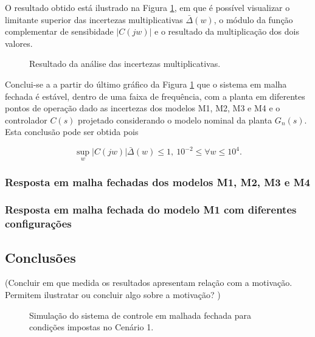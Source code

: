 O resultado obtido está ilustrado na Figura
\ref{fig:desafio-2:resultado-questao-3-4}, em que é possível visualizar o
limitante superior das incertezas multiplicativas $\bar{\Delta}(w)$, o módulo da
função complementar de sensibidade $|\textit{C}(jw)|$ e o resultado da
multiplicação dos dois valores.

\begin{figure}[!ht]
    \caption{Resultado da análise das incertezas multiplicativas.}
    \vspace{-10pt}
    \hspace{-30pt}
    \label{fig:desafio-2:resultado-questao-3-4}
    \begin{minipage}{\linewidth}
        
    \end{minipage}
\end{figure}

Conclui-se a a partir do último gráfico da Figura
\ref{fig:desafio-2:resultado-questao-3-4} que o sistema em malha fechada é
estável, dentro de uma faixa de frequência, com a planta em diferentes pontos de
operação dado as incertezas dos modelos M1, M2, M3 e M4 e o controlador $C(s)$
projetado considerando o modelo nominal da planta $G_{n}(s)$. Esta conclusão
pode ser obtida pois

\begin{equation}
    \label{eq:desafio-2:principio-do-modelo-interno}
    \sup_{w}|\textit{C}(jw)|\bar{\Delta}(w) \le 1, \ 10^{-2} \leq \forall w \leq {10^{4}}.
\end{equation}

\subsubsection{Resposta em malha fechadas dos modelos M1, M2, M3 e M4}
\subsubsection{Resposta em malha fechada do modelo M1 com diferentes configurações}

\subsection{Conclusões}
(Concluir em que medida os resultados apresentam relação com a motivação.
Permitem ilustratar ou concluir algo sobre a motivação? )


\begin{figure}[!ht]
    \caption{Simulação do sistema de controle em malhada fechada para condições
    impostas no Cenário 1.}
    \vspace{-10pt}
    \hspace{-30pt}
    \label{fig:resultado-desafio2-questao5}
    \begin{minipage}{\linewidth}
        
    \end{minipage}
\end{figure}

